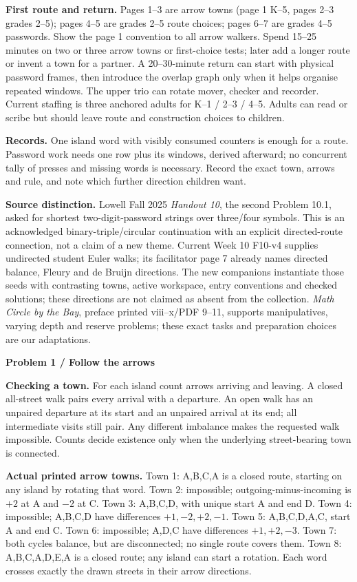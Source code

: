 \documentclass[11pt]{article}
\newcommand{\parttitle}[1]{{\large\bfseries\color{ink}#1}\par}
\newcommand{\labelled}[2]{\textbf{#1} #2\par}
\begin{document}
\labelled{First route and return.}{Pages 1--3 are arrow towns (page 1 K--5, pages 2--3 grades 2--5); pages 4--5 are grades 2--5 route choices; pages 6--7 are grades 4--5 passwords. Show the page 1 convention to all arrow walkers. Spend 15--25 minutes on two or three arrow towns or first-choice tests; later add a longer route or invent a town for a partner. A 20--30-minute return can start with physical password frames, then introduce the overlap graph only when it helps organise repeated windows. The upper trio can rotate mover, checker and recorder. Current staffing is three anchored adults for K--1 / 2--3 / 4--5. Adults can read or scribe but should leave route and construction choices to children.}
\labelled{Records.}{One island word with visibly consumed counters is enough for a route. Password work needs one row plus its windows, derived afterward; no concurrent tally of presses and missing words is necessary. Record the exact town, arrows and rule, and note which further direction children want.}
\labelled{Source distinction.}{Lowell Fall 2025 \emph{Handout 10}, the second Problem 10.1, asked for shortest two-digit-password strings over three/four symbols. This is an acknowledged binary-triple/circular continuation with an explicit directed-route connection, not a claim of a new theme. Current Week 10 F10-v4 supplies undirected student Euler walks; its facilitator page 7 already names directed balance, Fleury and de Bruijn directions. The new companions instantiate those seeds with contrasting towns, active workspace, entry conventions and checked solutions; these directions are not claimed as absent from the collection. \emph{Math Circle by the Bay}, preface printed viii--x/PDF 9--11, supports manipulatives, varying depth and reserve problems; these exact tasks and preparation choices are our adaptations.}
\newpage
\parttitle{Problem 1 / Follow the arrows}
\labelled{Checking a town.}{For each island count arrows arriving and leaving. A closed all-street walk pairs every arrival with a departure. An open walk has an unpaired departure at its start and an unpaired arrival at its end; all intermediate visits still pair. Any different imbalance makes the requested walk impossible. Counts decide existence only when the underlying street-bearing town is connected.}
\labelled{Actual printed arrow towns.}{Town 1: A,B,C,A is a closed route, starting on any island by rotating that word. Town 2: impossible; outgoing-minus-incoming is $+2$ at A and $-2$ at C. Town 3: A,B,C,D, with unique start A and end D. Town 4: impossible; A,B,C,D have differences $+1,-2,+2,-1$. Town 5: A,B,C,D,A,C, start A and end C. Town 6: impossible; A,D,C have differences $+1,+2,-3$. Town 7: both cycles balance, but are disconnected; no single route covers them. Town 8: A,B,C,A,D,E,A is a closed route; any island can start a rotation. Each word crosses exactly the drawn streets in their arrow directions.}
\end{document}
